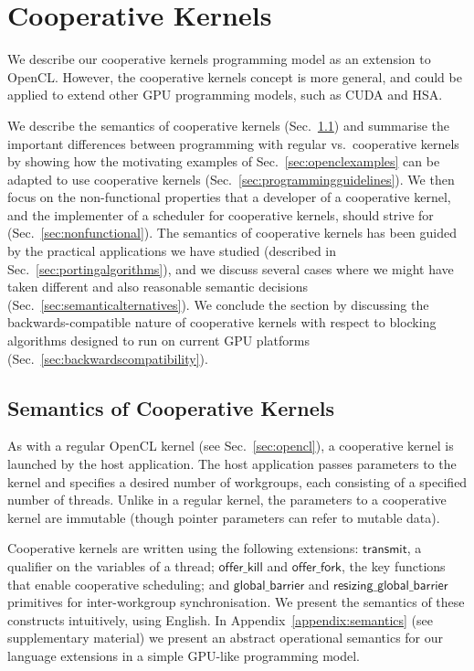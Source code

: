 \documentclass[numbers,nocopyrightspace,10pt]{sigplanconf}
\newcommand{\mysec}{Sec.~}
\newcommand{\transmit}{\mathsf{transmit}}
\newcommand{\offerfork}{\mathsf{offer\_fork}}
\newcommand{\offerkill}{\mathsf{offer\_kill}}
\newcommand{\globalbarrier}{\mathsf{global\_barrier}}
\newcommand{\resizingglobalbarrier}{\mathsf{resizing\_global\_barrier}}
\begin{document}
\section{Cooperative Kernels}\label{sec:cooperativekernels}

We describe our cooperative kernels programming model as an extension
to OpenCL.  However, the cooperative kernels concept is more general,
and could be applied to extend other GPU programming models, such as
CUDA and HSA.

We describe the semantics of cooperative kernels
(\mysec\ref{sec:semantics}) and summarise the important
differences between programming with regular vs.\ cooperative kernels
by showing how the motivating examples of \mysec\ref{sec:openclexamples} can be adapted to use cooperative kernels
(\mysec\ref{sec:programmingguidelines}).
We then focus on the non-functional
properties that a developer of a cooperative kernel, and the
implementer of a scheduler for cooperative kernels, should strive for
(\mysec\ref{sec:nonfunctional}).  The semantics of cooperative
kernels has been guided by the practical applications we have studied
(described in \mysec\ref{sec:portingalgorithms}), and we discuss several cases where we
might have taken different and also reasonable semantic decisions (\mysec\ref{sec:semanticalternatives}).
We conclude the section by discussing the backwards-compatible nature
of cooperative kernels with respect to blocking algorithms designed to
run on current GPU platforms
(\mysec\ref{sec:backwardscompatibility}).

\subsection{Semantics of Cooperative Kernels}\label{sec:semantics}

As with a regular OpenCL kernel (see \mysec\ref{sec:opencl}), a
cooperative kernel is launched by the host application.  The host
application passes parameters to the kernel and specifies a desired
number of workgroups, each consisting of a specified number of
threads.  Unlike in a regular kernel, the parameters to a cooperative kernel are immutable (though pointer
parameters can refer to mutable data).

Cooperative kernels are written using the following 
extensions: $\transmit$, a qualifier on the variables of a
thread; $\offerkill$ and $\offerfork$, the key functions that enable
cooperative scheduling; and $\globalbarrier$ and $\resizingglobalbarrier$
primitives for inter-workgroup synchronisation.
%
We present the semantics of these constructs intuitively, using English.
In Appendix~\ref{appendix:semantics} (see supplementary material) we present an abstract operational semantics for our language extensions in a simple GPU-like programming model.
\end{document}
